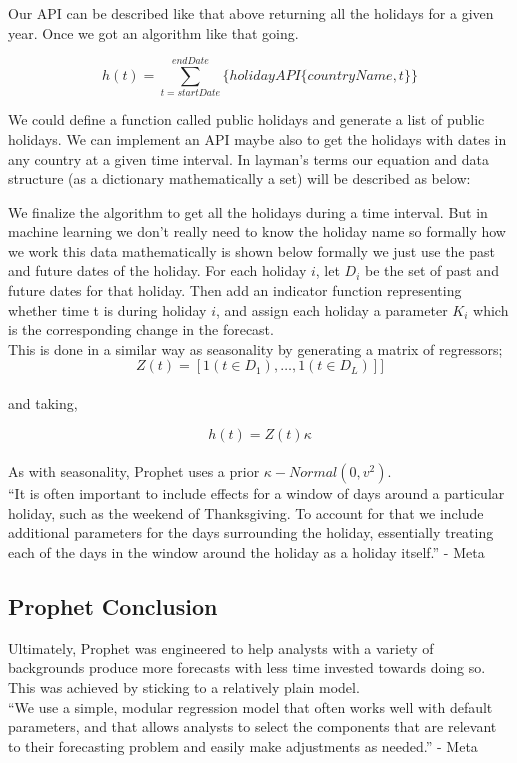 Our API can be described like that above returning all the holidays for a given year. Once we got an algorithm like that going.

\begin{equation} 
    h(t) = \sum_{t=startDate}^{endDate} \{ holidayAPI\{countryName,t\} \} 
\end{equation}

We could define a function called public holidays and generate a list of public holidays. We can implement an API maybe also to get the holidays with dates in any country at a given time interval. In layman’s terms our equation and data structure (as a dictionary mathematically a set) will be described as below:

We finalize the algorithm to get all the holidays during a time interval. But in machine learning we don’t really need to know the holiday name so formally how we work this data mathematically is shown below formally we just use the past and future dates of the holiday.
For each holiday $i$, let $D_i$ be the set of past and future dates for that holiday. Then add an indicator function representing whether time t is during holiday $i$, and assign each holiday a parameter $K_i$ which is the corresponding change in the forecast.\\

This is done in a similar way as seasonality by generating a matrix of regressors; \\
\begin{equation}
    Z(t)= [1(t \in D_1),…,1(t \in D_L)]] 
\end{equation} \\

and taking,

\begin{equation}
    h(t) = Z(t)\kappa 
\end{equation} \\

As with seasonality, Prophet uses a prior $\kappa-Normal(0,v^2)$. \\ 

“It is often important to include effects for a window of days around a particular holiday, such as the weekend of Thanksgiving. To account for that we include additional parameters for the days surrounding the holiday, essentially treating each of the days in the window around the holiday as a holiday itself.” - Meta

\subsection{Prophet Conclusion}
Ultimately, Prophet was engineered to help analysts with a variety of backgrounds produce more forecasts with less time invested towards doing so. This was achieved by sticking to a relatively plain model. \\ 
“We use a simple, modular regression model that often works well with default parameters, and that allows analysts to select the components that are relevant to their forecasting problem and easily make adjustments as needed.” - Meta


